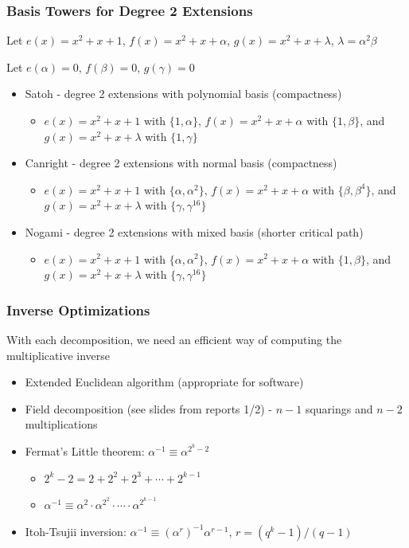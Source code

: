 \documentclass[handout]{beamer}
\begin{document}
\begin{frame}
	\frametitle{Basis Towers for Degree 2 Extensions}
	Let $e(x) = x^2 + x + 1$, $f(x) = x^2 + x + \alpha$, $g(x) = x^2 + x + \lambda$, $\lambda = \alpha^2\beta$

	\medskip 

	Let $e(\alpha) = 0$, $f(\beta) = 0$, $g(\gamma) = 0$
	\begin{itemize}
		\item Satoh - degree 2 extensions with polynomial basis (compactness)
		\begin{itemize}
			\item $e(x) = x^2 + x + 1$ with $\{1, \alpha\}$, $f(x) = x^2 + x + \alpha$ with $\{1, \beta\}$, and $g(x) = x^2 + x + \lambda$ with $\{1, \gamma\}$
		\end{itemize}
		\item Canright - degree 2 extensions with normal basis (compactness)
		\begin{itemize}
			\item $e(x) = x^2 + x + 1$ with $\{\alpha, \alpha^2\}$, $f(x) = x^2 + x + \alpha$ with $\{\beta, \beta^4\}$, and $g(x) = x^2 + x + \lambda$ with $\{\gamma, \gamma^{16}\}$
		\end{itemize}
		\item Nogami - degree 2 extensions with mixed basis (shorter critical path)
		\begin{itemize}
			\item $e(x) = x^2 + x + 1$ with $\{\alpha, \alpha^2\}$, $f(x) = x^2 + x + \alpha$ with $\{1, \beta\}$, and $g(x) = x^2 + x + \lambda$ with $\{\gamma, \gamma^{16}\}$
		\end{itemize}
	\end{itemize}
\end{frame}

\begin{frame}
	\frametitle{Inverse Optimizations}
	With each decomposition, we need an efficient way of computing the multiplicative inverse
	\begin{itemize}
		\item Extended Euclidean algorithm (appropriate for software)
		\item Field decomposition (see slides from reports 1/2) - $n-1$ squarings and $n-2$ multiplications
		\item Fermat's Little theorem: $\alpha^{-1} \equiv \alpha^{2^k - 2}$
		\begin{itemize}
			\item $2^k - 2 = 2 + 2^2 + 2^3 + \dotsb + 2^{k-1}$
			\item $\alpha^{-1} \equiv \alpha^2 \cdot \alpha^{2^2} \cdot \dotsb \cdot \alpha^{2^{k-1}}$
		\end{itemize}
		\item Itoh-Tsujii inversion: $\alpha^{-1} \equiv (\alpha^{r})^{-1}\alpha^{r-1}$, $r = (q^k - 1)/(q-1)$
	\end{itemize}
\end{frame}
\end{document}
